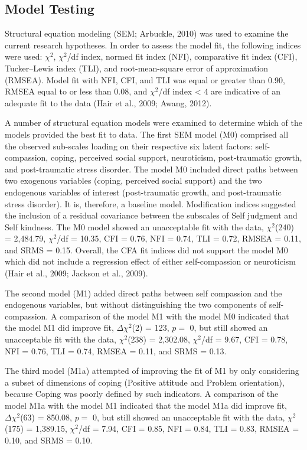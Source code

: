 \documentclass[
  english,
  man,floatsintext]{apa7}
\begin{document}
\hypertarget{model-testing}{%
\subsection{Model Testing}\label{model-testing}}

Structural equation modeling (SEM; Arbuckle, 2010) was used to examine the current research hypotheses.
In order to assess the model fit, the following indices were used: \(\chi^2\), \(\chi^2\)/df index, normed fit index (NFI), comparative fit index (CFI), Tucker--Lewis index (TLI), and root-mean-square error of approximation (RMSEA).
Model fit with NFI, CFI, and TLI was equal or greater than 0.90, RMSEA equal to or less than 0.08, and \(\chi^2\)/df index \textless{} 4 are indicative of an adequate fit to the data (Hair et al., 2009; Awang, 2012).

A number of structural equation models were examined to determine which of the models provided the best fit to data.
The first SEM model (M0) comprised all the observed sub-scales loading on their respective six latent factors: self-compassion, coping, perceived social support, neuroticism, post-traumatic growth, and post-traumatic stress disorder.
The model M0 included direct paths between two exogenous variables (coping, perceived social support) and the two endogenous variables of interest (post-traumatic growth, and post-traumatic stress disorder).
It is, therefore, a baseline model.
Modification indices suggested the inclusion of a residual covariance between the subscales of Self judgment and Self kindness.
The M0 model showed an unacceptable fit with the data, \(\chi^2\)(240) = 2,484.79, \(\chi^2\)/df = 10.35, CFI = 0.76, NFI = 0.74, TLI = 0.72, RMSEA = 0.11, and SRMS = 0.15.
Overall, the CFA fit indices did not support the model M0 which did not include a regression effect of either self-compassion or neuroticism (Hair et al., 2009; Jackson et al., 2009).

The second model (M1) added direct paths between self compassion and the endogenous variables, but without distinguishing the two components of self-compassion.
A comparison of the model M1 with the model M0 indicated that the model M1 did improve fit, \(\Delta \chi^2\)(2) = 123, \(p =\) 0, but still showed an unacceptable fit with the data, \(\chi^2\)(238) = 2,302.08, \(\chi^2\)/df = 9.67, CFI = 0.78, NFI = 0.76, TLI = 0.74, RMSEA = 0.11, and SRMS = 0.13.

The third model (M1a) attempted of improving the fit of M1 by only considering a subset of dimensions of coping (Positive attitude and Problem orientation), because Coping was poorly defined by such indicators.
A comparison of the model M1a with the model M1 indicated that the model M1a did improve fit, \(\Delta \chi^2\)(63) = 850.08, \(p =\) 0, but still showed an unacceptable fit with the data, \(\chi^2\)(175) = 1,389.15, \(\chi^2\)/df = 7.94, CFI = 0.85, NFI = 0.84, TLI = 0.83, RMSEA = 0.10, and SRMS = 0.10.
\end{document}
